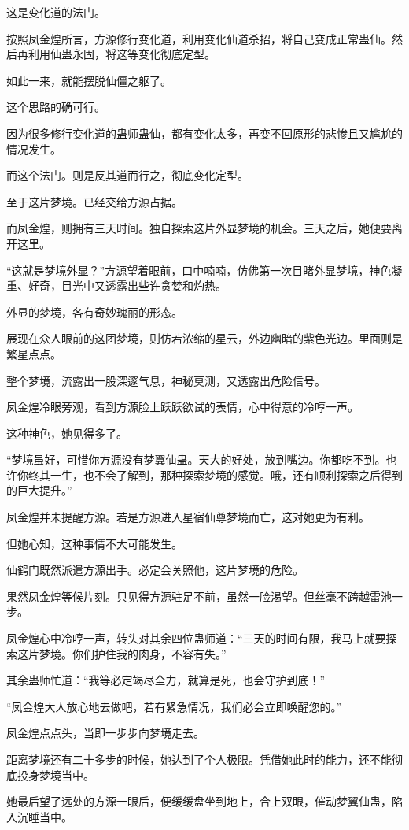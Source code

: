 \begin{this_body}
这是变化道的法门。

按照凤金煌所言，方源修行变化道，利用变化仙道杀招，将自己变成正常蛊仙。然后再利用仙蛊永固，将这等变化彻底定型。

如此一来，就能摆脱仙僵之躯了。

这个思路的确可行。

因为很多修行变化道的蛊师蛊仙，都有变化太多，再变不回原形的悲惨且又尴尬的情况发生。

而这个法门。则是反其道而行之，彻底变化定型。

至于这片梦境。已经交给方源占据。

而凤金煌，则拥有三天时间。独自探索这片外显梦境的机会。三天之后，她便要离开这里。

“这就是梦境外显？”方源望着眼前，口中喃喃，仿佛第一次目睹外显梦境，神色凝重、好奇，目光中又透露出些许贪婪和灼热。

外显的梦境，各有奇妙瑰丽的形态。

展现在众人眼前的这团梦境，则仿若浓缩的星云，外边幽暗的紫色光边。里面则是繁星点点。

整个梦境，流露出一股深邃气息，神秘莫测，又透露出危险信号。

凤金煌冷眼旁观，看到方源脸上跃跃欲试的表情，心中得意的冷哼一声。

这种神色，她见得多了。

“梦境虽好，可惜你方源没有梦翼仙蛊。天大的好处，放到嘴边。你都吃不到。也许你终其一生，也不会了解到，那种探索梦境的感觉。哦，还有顺利探索之后得到的巨大提升。”

凤金煌并未提醒方源。若是方源进入星宿仙尊梦境而亡，这对她更为有利。

但她心知，这种事情不大可能发生。

仙鹤门既然派遣方源出手。必定会关照他，这片梦境的危险。

果然凤金煌等候片刻。只见得方源驻足不前，虽然一脸渴望。但丝毫不跨越雷池一步。

凤金煌心中冷哼一声，转头对其余四位蛊师道：“三天的时间有限，我马上就要探索这片梦境。你们护住我的肉身，不容有失。”

其余蛊师忙道：“我等必定竭尽全力，就算是死，也会守护到底！”

“凤金煌大人放心地去做吧，若有紧急情况，我们必会立即唤醒您的。”

凤金煌点点头，当即一步步向梦境走去。

距离梦境还有二十多步的时候，她达到了个人极限。凭借她此时的能力，还不能彻底投身梦境当中。

她最后望了远处的方源一眼后，便缓缓盘坐到地上，合上双眼，催动梦翼仙蛊，陷入沉睡当中。


\end{this_body}
